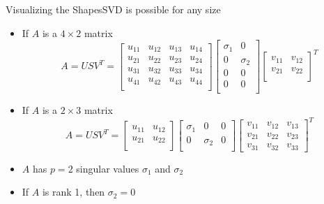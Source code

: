 \documentclass[10pt]{beamer}
\begin{document}

\begin{frame}{Visualizing the Shapes}{SVD is possible for any size}
\begin{itemize}
    \item If $A$ is a $4 \times 2$ matrix  
\begin{equation*}
A = U S V^T = \begin{bmatrix}
    u_{11} & u_{12}  & u_{13} & u_{14}\\
    u_{21} & u_{22}  & u_{23} & u_{24}\\
    u_{31} & u_{32} & u_{33}  & u_{34}\\ 
    u_{41} & u_{42} & u_{43}  & u_{44}\\ 
\end{bmatrix} \begin{bmatrix}
    \sigma_1 & 0  \\
    0 & \sigma_2  \\
    0 & 0   \\ 
    0 & 0   \\ 
\end{bmatrix} \begin{bmatrix}
    v_{11} & v_{12}\\
    v_{21} & v_{22} \\
\end{bmatrix}^T
\end{equation*}

    \item If $A$ is a $2 \times 3$ matrix 
    \begin{equation*}
A = U S V^T = \begin{bmatrix}
    u_{11} & u_{12} \\
    u_{21} & u_{22}  \\
\end{bmatrix} \begin{bmatrix}
    \sigma_1 & 0 & 0 \\
    0 & \sigma_2  & 0 \\
\end{bmatrix} \begin{bmatrix}
    v_{11} & v_{12} & v_{13} \\
    v_{21} & v_{22} & v_{23} \\
    v_{31} & v_{32} & v_{33}
\end{bmatrix}^T
\end{equation*}

\item $A$ has $p= 2$ singular values $\sigma_1$ and $\sigma_2$

\item If $A$ is rank 1, then $\sigma_2 = 0$


\end{itemize}

\end{frame}
\end{document}
